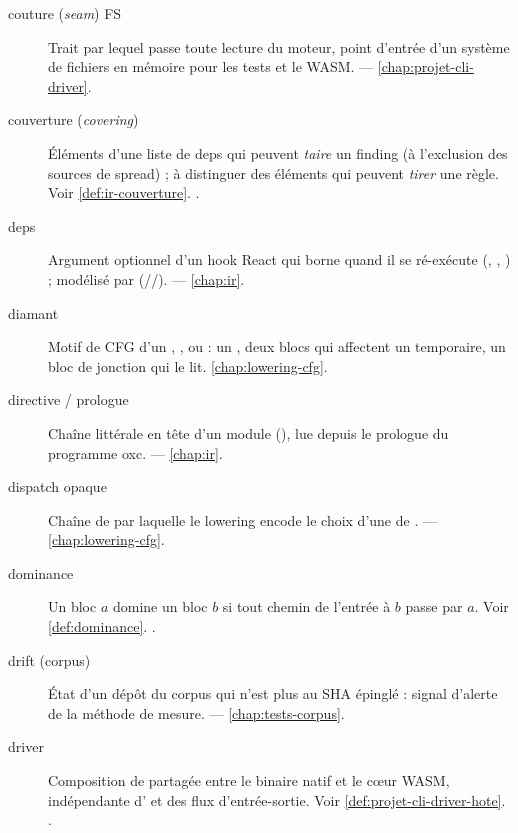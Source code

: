\begin{description}
\item[couture (\emph{seam}) FS] Trait  par lequel passe toute lecture du moteur, point d'entrée d'un système de fichiers en mémoire pour les tests et le WASM.  — \cref{chap:projet-cli-driver}.

\item[couverture (\emph{covering})] Éléments d'une liste de deps qui peuvent \emph{taire} un finding (à l'exclusion des sources de spread) ; à distinguer des éléments qui peuvent \emph{tirer} une règle. Voir \cref{def:ir-couverture}. .

\item[deps] Argument optionnel d'un hook React qui borne quand il se ré-exécute (, , ) ; modélisé par  (//).  — \cref{chap:ir}.

\item[diamant] Motif de CFG d'un , \code{\&\&}, \code{||} ou  : un , deux blocs qui affectent un temporaire, un bloc de jonction qui le lit. \cref{chap:lowering-cfg}.

\item[directive / prologue] Chaîne littérale en tête d'un module (), lue depuis le prologue du programme oxc.  — \cref{chap:ir}.

\item[dispatch opaque] Chaîne de  par laquelle le lowering encode le choix d'une  de .  — \cref{chap:lowering-cfg}.

\item[dominance] Un bloc \(a\) domine un bloc \(b\) si tout chemin de l'entrée à \(b\) passe par \(a\). Voir \cref{def:dominance}. .

\item[drift (corpus)] État d'un dépôt du corpus qui n'est plus au SHA épinglé : signal d'alerte de la méthode de mesure.  — \cref{chap:tests-corpus}.

\item[driver] Composition de  partagée entre le binaire natif et le c\oe{}ur WASM, indépendante d' et des flux d'entrée-sortie. Voir \cref{def:projet-cli-driver-hote}. .


\end{description}
